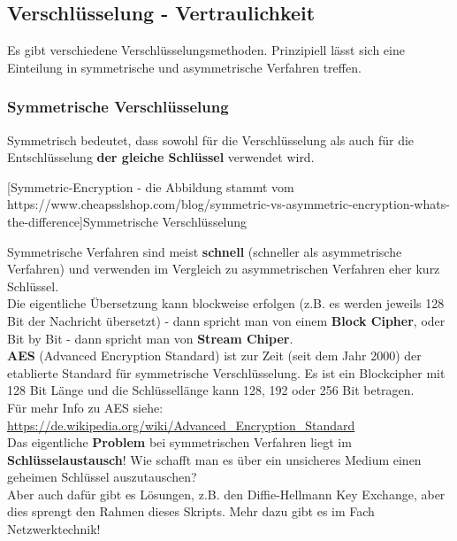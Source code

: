 \documentclass[10pt,a4paper,titlepage]{paper}
\begin{document}
\subsection{Verschlüsselung - Vertraulichkeit}
Es gibt verschiedene Verschlüsselungsmethoden. Prinzipiell lässt sich eine Einteilung in symmetrische und asymmetrische Verfahren treffen.

\subsubsection{Symmetrische Verschlüsselung}
Symmetrisch bedeutet, dass sowohl für die Verschlüsselung als auch für die Entschlüsselung \textbf{der gleiche Schlüssel} verwendet wird.\\
\begin{center}
[Symmetric-Encryption - die Abbildung stammt vom https://www.cheapsslshop.com/blog/symmetric-vs-asymmetric-encryption-whats-the-difference]{Symmetrische Verschlüsselung}
\end{center}
Symmetrische Verfahren sind meist \textbf{schnell} (schneller als asymmetrische Verfahren) und verwenden im Vergleich zu asymmetrischen Verfahren eher kurz Schlüssel.\\
Die eigentliche Übersetzung kann blockweise erfolgen (z.B. es werden jeweils 128 Bit der Nachricht übersetzt) - dann spricht man von einem \textbf{Block Cipher}, oder Bit by Bit - dann spricht man von \textbf{Stream Chiper}.\vspace{.3cm}\\
\textbf{AES} (Advanced Encryption Standard) ist zur Zeit (seit dem Jahr 2000) der etablierte Standard für symmetrische Verschlüsselung. Es ist ein Blockcipher mit 128 Bit Länge und die Schlüssellänge kann 128, 192 oder 256 Bit betragen.\\
Für mehr Info zu AES siehe:\\
\href{https://de.wikipedia.org/wiki/Advanced_Encryption_Standard}{\color{blue}https://de.wikipedia.org/wiki/Advanced\_Encryption\_Standard}\vspace{.3cm}\\
Das eigentliche \textbf{Problem} bei symmetrischen Verfahren liegt im \textbf{Schlüsselaustausch}! Wie schafft man es über ein unsicheres Medium einen geheimen Schlüssel auszutauschen?\\
Aber auch dafür gibt es Lösungen, z.B. den Diffie-Hellmann Key Exchange, aber dies sprengt den Rahmen dieses Skripts. Mehr dazu gibt es im Fach Netzwerktechnik!
\end{document}
